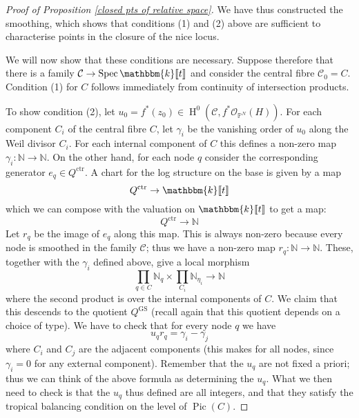 \documentclass[11pt]{amsart}
\newcommand{\formLine}{\spec \mathbbm{k}\llbracket t \rrbracket}
\newcommand{\spec}{\operatorname{Spec}}
\newcommand{\PP}{\mathbb P}
\newcommand{\N}{\mathbb{N}}
\newcommand{\OO}{\mathcal{O}}
\renewcommand{\to}{\rightarrow}
\newcommand{\Pic}{\operatorname{Pic}}
\newcommand{\HH}{\operatorname{H}}
\newcommand{\Ccal}{\mathcal{C}}
\theoremstyle{definition}
\theoremstyle{definition}
\begin{document}
\begin{proof}[Proof of Proposition \ref{closed pts of relative space}]
We have thus constructed the smoothing, which shows that conditions (1) and (2) above are sufficient to characterise points in the closure of the nice locus.

We will now show that these conditions are necessary. Suppose therefore that there is a family $\Ccal \to \formLine$ and consider the central fibre $\Ccal_0 = C$. Condition (1) for $C$ follows immediately from continuity of intersection products.

To show condition (2), let $u_0 = f^*(z_0) \in \HH^0(\Ccal,f^* \OO_{\PP^N}(H))$. For each component $C_i$ of the central fibre $C$, let $\gamma_i$ be the vanishing order of $u_0$ along the Weil divisor $C_i$. For each internal component of $C$ this defines a non-zero map $\gamma_i \colon \N \to \N$. On the other hand, for each node $q$ consider the corresponding generator $e_q \in Q^{\operatorname{ctr}}$. A chart for the log structure on the base is given by a map
\begin{equation*} Q^{\operatorname{ctr}} \to \mathbbm{k} \llbracket t \rrbracket \end{equation*}
which we can compose with the valuation on $\mathbbm{k} \llbracket t \rrbracket$ to get a map:
\begin{equation*} Q^{\operatorname{ctr}} \to \N \end{equation*}
Let $r_q$ be the image of $e_q$ along this map. This is always non-zero because every node is smoothed in the family $\Ccal$; thus we have a non-zero map $r_q \colon \N \to \N$. These, together with the $\gamma_i$ defined above, give a local morphism
\begin{equation*} \prod_{q \in C} \N_q \times \prod_{C_i} \N_{\eta_i} \to \N \end{equation*}
where the second product is over the internal components of $C$. We claim that this descends to the quotient $Q^{\operatorname{GS}}$ (recall again that this quotient depends on a choice of type). We have to check that for every node $q$ we have
\begin{equation*} u_q r_q = \gamma_i - \gamma_j \end{equation*}
where $C_i$ and $C_j$ are the adjacent components (this makes for all nodes, since $\gamma_i=0$ for any external component). Remember that the $u_q$ are not fixed a priori; thus we can think of the above formula as determining the $u_q$. What we then need to check is that the $u_q$ thus defined are all integers, and that they satisfy the tropical balancing condition on the level of $\Pic (C)$.


\end{proof}
\end{document}
